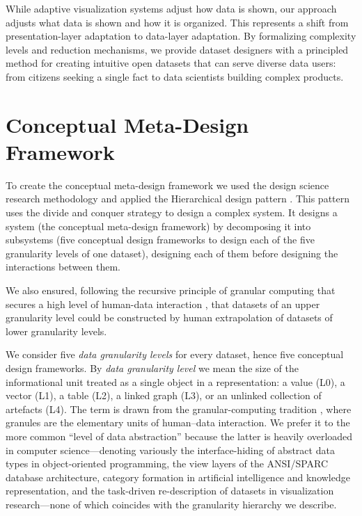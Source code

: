 \documentclass[]{hdsr}
\theoremstyle{plain}      %
\theoremstyle{definition} %
\theoremstyle{remark}     %
\begin{document}
\vspace{1em}

\noindent While adaptive visualization systems adjust how data is shown, our approach adjusts what data is shown and how it is organized. This represents a shift from presentation-layer adaptation to data-layer adaptation. By formalizing complexity levels and reduction mechanisms, we provide dataset designers with a principled method for creating intuitive open datasets that can serve diverse data users: from citizens seeking a single fact to data scientists building complex products.

\section{Conceptual Meta-Design Framework}
\label{sec:framework}

To create the conceptual meta-design framework we used the design science research methodology \citep{hevner2004} and applied the Hierarchical design pattern \citep{vaishnavi2015}. This pattern uses the divide and conquer strategy to design a complex system. It designs a system (the conceptual meta-design framework) by decomposing it into subsystems (five conceptual design frameworks to design each of the five granularity levels of one dataset), designing each of them before designing the interactions between them.

We also ensured, following the recursive principle of granular computing that secures a high level of human-data interaction \citep{wilke2016}, that datasets of an upper granularity level could be constructed by human extrapolation of datasets of lower granularity levels.

We consider five \emph{data granularity levels} for every dataset, hence five conceptual design frameworks. By \emph{data granularity level} we mean the size of the informational unit treated as a single object in a representation: a value (L0), a vector (L1), a table (L2), a linked graph (L3), or an unlinked collection of artefacts (L4). The term is drawn from the granular-computing tradition \citep{wilke2016}, where granules are the elementary units of human--data interaction. We prefer it to the more common ``level of data abstraction'' because the latter is heavily overloaded in computer science---denoting variously the interface-hiding of abstract data types in object-oriented programming, the view layers of the ANSI/SPARC database architecture, category formation in artificial intelligence and knowledge representation, and the task-driven re-description of datasets in visualization research---none of which coincides with the granularity hierarchy we describe.
\end{document}
